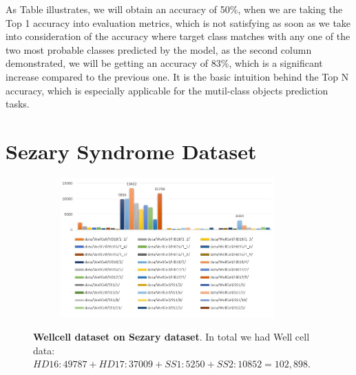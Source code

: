 As Table illustrates, we will obtain an accuracy of 50\%, when we are taking the Top 1 accuracy into evaluation metrics, which is not satisfying as soon as we take into consideration of the accuracy where target class matches with any one of the two most probable classes predicted by the model, as the second column demonstrated, we will be getting an accuracy of 83\%, which is a significant increase compared to the previous one. It is the basic intuition behind the Top N accuracy, which is especially applicable for the mutil-class objects prediction tasks.





\section{Sezary Syndrome Dataset}
\label{sec:lorem}

\begin{figure}[h]
	\begin{center}
		\begin{subfigure}[b]{\textwidth}
		    \centering
			\includegraphics[width=0.9\textwidth]{thesis-template-master/images/wellcellSezary dataset.JPG}
			\label{fig:cellnet}
		\end{subfigure}
	\end{center}
	\caption{\textbf{Wellcell dataset on Sezary dataset}. In total we had Well cell data:$HD16:49787+ HD17:37009+SS1:5250+SS2:10852= 102,898$.}
\end{figure}

